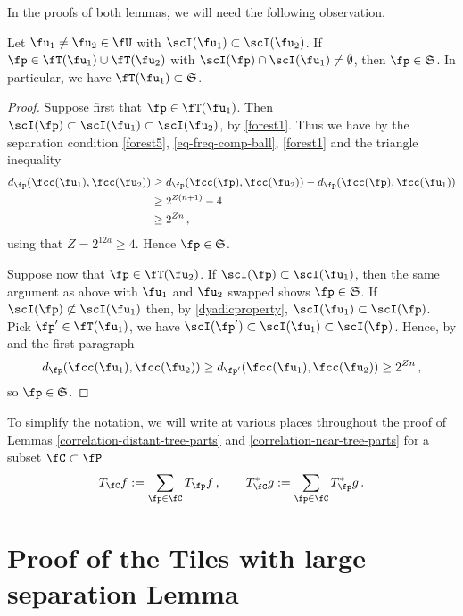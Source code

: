 In the proofs of both lemmas, we will need the following observation.

\begin{lemma}
    \label{overlap-implies-distance}
    Let $\fu_1 \ne \fu_2 \in \fU$ with $\scI(\fu_1) \subset \scI(\fu_2)$. If $\fp \in \fT(\fu_1) \cup \fT(\fu_2)$ with $\scI(\fp) \cap \scI(\fu_1) \ne \emptyset$, then $\fp \in \mathfrak{S}$. In particular, we have $\fT(\fu_1) \subset \mathfrak{S}$.
\end{lemma}

\begin{proof}
    Suppose first that $\fp \in \fT(\fu_1)$. Then $\scI(\fp) \subset \scI(\fu_1) \subset \scI(\fu_2)$, by \eqref{forest1}. Thus we have by the separation condition \eqref{forest5}, \eqref{eq-freq-comp-ball}, \eqref{forest1} and the triangle inequality
    \begin{align*}
        d_{\fp}(\fcc(\fu_1), \fcc(\fu_2)) &\ge d_{\fp}(\fcc(\fp), \fcc(\fu_2)) - d_{\fp}(\fcc(\fp), \fcc(\fu_1))\\
        &\ge 2^{Z(n+1)} - 4\\
        &\ge 2^{Zn}\,,
    \end{align*}
    using that $Z= 2^{12a}\ge 4$. Hence $\fp \in \mathfrak{S}$.

    Suppose now that $\fp \in \fT(\fu_2)$. If $\scI(\fp) \subset \scI(\fu_1)$, then the same argument as above with $\fu_1$ and $\fu_2$ swapped shows $\fp \in \mathfrak{S}$. If $\scI(\fp) \not \subset \scI(\fu_1)$ then, by \eqref{dyadicproperty}, $\scI(\fu_1) \subset \scI(\fp)$. Pick $\fp' \in \fT(\fu_1)$, we have $\scI(\fp') \subset \scI(\fu_1) \subset \scI(\fp)$. Hence, by  and the first paragraph
    $$
        d_{\fp}(\fcc(\fu_1), \fcc(\fu_2)) \ge d_{\fp'}(\fcc(\fu_1), \fcc(\fu_2)) \ge 2^{Zn}\,,
    $$
    so $\fp \in \mathfrak{S}$.
\end{proof}

To simplify the notation, we will write at various places throughout the proof of Lemmas \ref{correlation-distant-tree-parts} and \ref{correlation-near-tree-parts} for a subset $\fC \subset \fP$
$$
    T_{\fC} f := \sum_{\fp \in \fC} T_{\fp} f\,, \quad\quad T_{\fC}^* g := \sum_{\fp\in\fC} T_{\fp}^* g\,.
$$

\section{Proof of the Tiles with large separation Lemma}
    \label{subsec-big-tiles}

